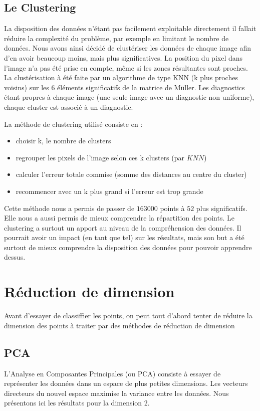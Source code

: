 \documentclass[a4paper,10pt]{report}
\begin{document}
\subsection{Le Clustering}
La disposition des données n'étant pas facilement exploitable directement il fallait réduire la complexité du problème, par exemple en limitant le nombre de données. Nous avons ainsi décidé de clustériser les données de chaque image afin d'en avoir beaucoup moins, mais plus significatives. La position du pixel dans l'image n'a pas été prise en compte, même si les zones résultantes sont proches. La clustérisation à été faite par un algorithme de type KNN (k plus proches voisins) sur les $6$ éléments significatifs de la matrice de Müller. Les diagnostics étant propres à chaque image (une seule image avec un diagnostic non uniforme), chaque cluster est associé à un diagnostic. 

La méthode de clustering utilisé consiste en :
\begin{itemize}
\item choisir k, le nombre de clusters
\item regrouper les pixels de l'image selon ces k clusters (par $KNN$)
\item calculer l'erreur totale commise (somme des distances au centre du cluster)
\item recommencer avec un k plus grand si l'erreur est trop grande
\end{itemize}

Cette méthode nous a permis de passer de $163 000$ points à $52$ plus significatifs. Elle nous a aussi permis de mieux comprendre la répartition des points. Le clustering a surtout un apport au niveau de la compréhension des données. Il pourrait avoir un impact (en tant que tel) sur les résultats, mais son but a été surtout de mieux comprendre la disposition des données pour pouvoir apprendre dessus.

\section{Réduction de dimension}

Avant d'essayer de classiffier les points, on peut tout d’abord tenter de réduire la dimension des points à traiter par des méthodes de réduction de dimension
\subsection{PCA}
L'Analyse en Composantes Principales (ou PCA) consiste à essayer de représenter les données dans un espace de plus petites dimensions. Les vecteurs directeurs du nouvel espace maximise la variance entre les données. Nous présentons ici les résultats pour la dimension 2.
\end{document}
